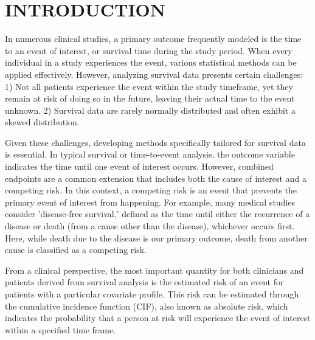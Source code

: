 \documentclass[AMA,Times1COL]{WileyNJDv5} %
\begin{document}



\maketitle

\renewcommand\thefootnote{}

\renewcommand\thefootnote{\fnsymbol{footnote}}
\setcounter{footnote}{1}

\section{INTRODUCTION}\label{sec1}

In numerous clinical studies, a primary outcome frequently modeled is the time to an event of interest, or survival time during the study period. When every individual in a study experiences the event, various statistical methods can be applied effectively. However, analyzing survival data presents certain challenges: 1) Not all patients experience the event within the study timeframe, yet they remain at risk of doing so in the future, leaving their actual time to the event unknown. 2) Survival data are rarely normally distributed and often exhibit a skewed distribution.

Given these challenges, developing methods specifically tailored for survival data is essential. In typical survival or time-to-event analysis, the outcome variable indicates the time until one event of interest occurs. However, combined endpoints are a common extension that includes both the cause of interest and a competing risk. In this context, a competing risk is an event that prevents the primary event of interest from happening. For example, many medical studies consider 'disease-free survival,' defined as the time until either the recurrence of a disease or death (from a cause other than the disease), whichever occurs first. Here, while death due to the disease is our primary outcome, death from another cause is classified as a competing risk.

From a clinical perspective, the most important quantity for both clinicians and patients derived from survival analysis is the estimated risk of an event for patients with a particular covariate profile. This risk can be estimated through the cumulative incidence function (CIF), also known as absolute risk, which indicates the probability that a person at risk will experience the event of interest within a specified time frame.
\end{document}
